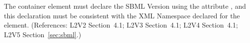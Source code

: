 The  container element must declare the SBML Version
using the attribute , and this declaration must be
consistent with the XML Namespace declared for the 
element.  (References: L2V2 Section~4.1; L2V3 Section~4.1; L2V4 Section~4.1; L2V5 Section~\ref{sec:sbml}.)
